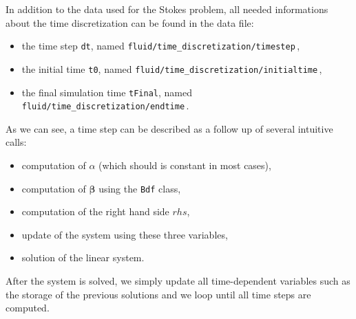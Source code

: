In addition to the data used for the Stokes problem, all needed informations about the time discretization can be found in the data file:

\begin{itemize}
\item the time step \verb!dt!, named \verb!fluid/time_discretization/timestep!\,,
\item the initial time \verb!t0!, named \verb!fluid/time_discretization/initialtime!\,,
\item the final simulation time \verb!tFinal!, named \verb!fluid/time_discretization/endtime!\,.
\end{itemize}

 As we can see, a time step can be described
as a follow up of several intuitive calls:
\begin{itemize}
\item computation of $\alpha$ (which should is constant in most cases),
\item computation of $\bm{\beta}$ using the \verb!Bdf! class,
\item computation of the right hand side $rhs$,
\item update of the system using these three variables,
\item solution of the linear system.
\end{itemize}
After the system is solved, we simply update all time-dependent variables such as the storage
of the previous solutions and we loop until all time steps are computed.


%
%
